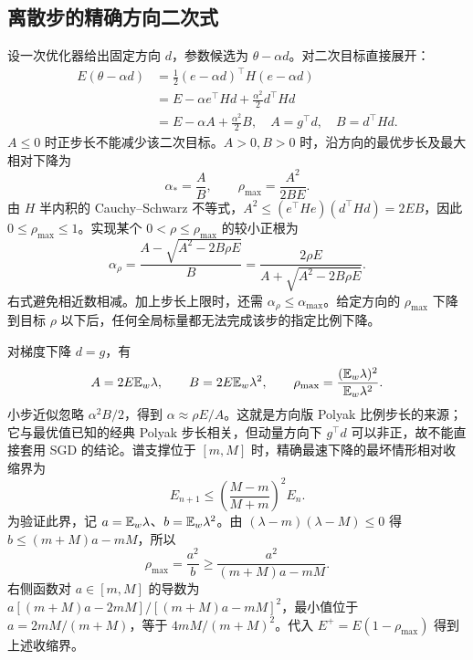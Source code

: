 \subsection{离散步的精确方向二次式}

设一次优化器给出固定方向 $d$，参数候选为 $\theta-\alpha d$。对二次目标直接展开：
\begin{align}
E(\theta-\alpha d)
&=\frac12(e-\alpha d)^\top H(e-\alpha d)\\
&=E-\alpha e^\top Hd+\frac{\alpha^2}2d^\top Hd\\
&=E-\alpha A+\frac{\alpha^2}2B,
\quad A=g^\top d,\quad B=d^\top Hd.
\label{dyn:scalar-ray}
\end{align}
$A\le0$ 时正步长不能减少该二次目标。$A>0,B>0$ 时，沿方向的最优步长及最大相对下降为
\begin{equation}
\alpha_*=\frac AB,\qquad
\rho_{\max}=\frac{A^2}{2BE}.
\end{equation}
由 $H$ 半内积的 Cauchy--Schwarz 不等式，$A^2\le(e^\top He)(d^\top Hd)=2EB$，因此 $0\le\rho_{\max}\le1$。实现某个 $0<\rho\le\rho_{\max}$ 的较小正根为
\begin{equation}
\alpha_\rho=\frac{A-\sqrt{A^2-2B\rho E}}B
=\frac{2\rho E}{A+\sqrt{A^2-2B\rho E}}.
\end{equation}
右式避免相近数相减。加上步长上限时，还需 $\alpha_\rho\le\alpha_{\max}$。给定方向的 $\rho_{\max}$ 下降到目标 $\rho$ 以下后，任何全局标量都无法完成该步的指定比例下降。

对梯度下降 $d=g$，有
\begin{equation}
A=2E\mathbb E_w\lambda,\qquad B=2E\mathbb E_w\lambda^2,\qquad
\rho_{\max}=\frac{(\mathbb E_w\lambda)^2}{\mathbb E_w\lambda^2}.
\end{equation}
小步近似忽略 $\alpha^2B/2$，得到 $\alpha\approx\rho E/A$。这就是方向版 Polyak 比例步长的来源；它与最优值已知的经典 Polyak 步长相关，但动量方向下 $g^\top d$ 可以非正，故不能直接套用 SGD 的结论。谱支撑位于 $[m,M]$ 时，精确最速下降的最坏情形相对收缩界为
\begin{equation}
E_{n+1}\le\left(\frac{M-m}{M+m}\right)^2E_n.
\end{equation}
为验证此界，记 $a=\mathbb E_w\lambda$、$b=\mathbb E_w\lambda^2$。由 $(\lambda-m)(\lambda-M)\le0$ 得 $b\le(m+M)a-mM$，所以
\begin{equation}
\rho_{\max}=\frac{a^2}{b}\ge\frac{a^2}{(m+M)a-mM}.
\end{equation}
右侧函数对 $a\in[m,M]$ 的导数为 $a[(m+M)a-2mM]/[(m+M)a-mM]^2$，最小值位于 $a=2mM/(m+M)$，等于 $4mM/(m+M)^2$。代入 $E^+=E(1-\rho_{\max})$ 得到上述收缩界。

